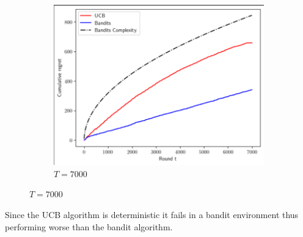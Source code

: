 \documentclass[12pt]{article}
\begin{document}
\begin{enumerate}
\begin{figure}[h!]
\begin{subfigure}[b]{0.45\textwidth}
				\includegraphics[width=\textwidth]{fig4.png}
				\caption{$T=7000$}
			\end{subfigure}		
		\end{figure}
	
		Since the UCB algorithm is deterministic it fails in a bandit environment thus performing worse than the bandit algorithm.
	\end{enumerate}
	
\end{document}

